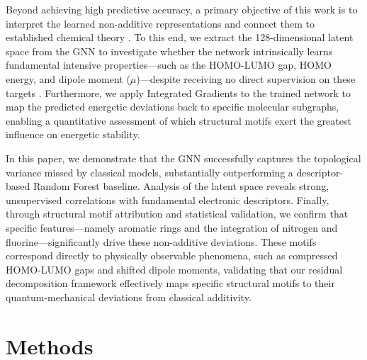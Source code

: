 \documentclass[]{article}
\begin{document}
Beyond achieving high predictive accuracy, a primary objective of this work is to interpret the learned non-additive representations and connect them to established chemical theory \citep{wang2023graphneuralnetworksmolecules,liu2026latentflowvisualanalyticslatent,han2026multimodalmolecularrepresentationlearning}. To this end, we extract the 128-dimensional latent space from the GNN to investigate whether the network intrinsically learns fundamental intensive properties---such as the HOMO-LUMO gap, HOMO energy, and dipole moment ($\mu$)---despite receiving no direct supervision on these targets \citep{choi2022scalabletraininggraphconvolutional,liu2026enhancingmolecularpropertypredictions,chakraborty2026duallevelatomiccoordinationgeometry}. Furthermore, we apply Integrated Gradients to the trained network to map the predicted energetic deviations back to specific molecular subgraphs, enabling a quantitative assessment of which structural motifs exert the greatest influence on energetic stability.

In this paper, we demonstrate that the GNN successfully captures the topological variance missed by classical models, substantially outperforming a descriptor-based Random Forest baseline. \citep{shui2020heterogeneousmoleculargraphneural,liu2021fastquantumpropertyprediction,rittig2022graphneuralnetworksprediction} Analysis of the latent space reveals strong, unsupervised correlations with fundamental electronic descriptors. \citep{lu2019molecularpropertypredictionmultilevel,liu2021fastquantumpropertyprediction,arjonamedina2024analysisatomlevelpretrainingquantum} Finally, through structural motif attribution and statistical validation, we confirm that specific features---namely aromatic rings and the integration of nitrogen and fluorine---significantly drive these non-additive deviations. \citep{shui2020heterogeneousmoleculargraphneural,wang2022motifbasedgraphrepresentationlearning,yu2025magemodellevelgraphneural} These motifs correspond directly to physically observable phenomena, such as compressed HOMO-LUMO gaps and shifted dipole moments, validating that our residual decomposition framework effectively maps specific structural motifs to their quantum-mechanical deviations from classical additivity. \citep{lu2019molecularpropertypredictionmultilevel,shui2020heterogeneousmoleculargraphneural,liu2021fastquantumpropertyprediction}

\section{Methods}
\label{sec:methods}
\end{document}
